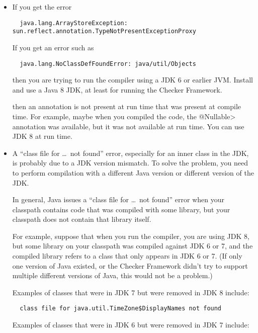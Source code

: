 \begin{itemize}
\item
If you get the error

\begin{Verbatim}
  java.lang.ArrayStoreException: sun.reflect.annotation.TypeNotPresentExceptionProxy
\end{Verbatim}

\noindent
If you get an error such as

\begin{Verbatim}
  java.lang.NoClassDefFoundError: java/util/Objects
\end{Verbatim}

\noindent
then you are trying to run the compiler using a JDK 6 or earlier JVM\@.
Install and use a Java 8
JDK, at least for running the Checker
Framework.

\noindent
then an annotation is not present at run time that was present at compile
time.  For example, maybe when you compiled the code, the \<@Nullable>
annotation was available, but it was not available at run time.
You can use JDK 8 at run time.

\item
A ``class file for \ldots\ not found'' error, especially for an inner class
in the JDK, is probably due to a JDK version mismatch.  To solve the
problem, you need to perform compilation with a different Java version or
different version of the JDK\@.

In general, Java issues a ``class file for \ldots\ not found'' error when
your classpath contains code that was compiled
with some library, but your classpath does not contain that library itself.

For example, suppose that when you run the compiler, you are using JDK 8,
but some library on your classpath was compiled against JDK 6 or 7, and the
compiled library refers to a class that only appears in JDK 6 or 7.  (If only
one version of Java existed, or the Checker Framework didn't try to support
multiple different versions of Java, this would not be a problem.)

Examples of classes that were in JDK 7 but were removed in JDK 8 include:

\begin{Verbatim}
  class file for java.util.TimeZone$DisplayNames not found
\end{Verbatim}

Examples of classes that were in JDK 6 but were removed in JDK 7 include:


\end{itemize}
